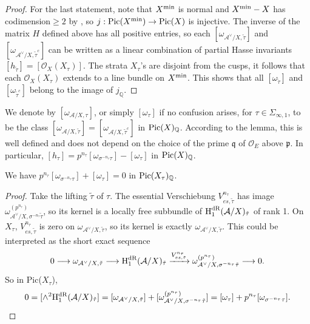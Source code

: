 \documentclass{article}
\begin{document}
\begin{proof}
For the last statement, note that $X^{\textnormal{min}}$ is normal and $X^{\textnormal{min}}-X$ has codimension$\ge2$ by \citep{Lan}, so $j:\textnormal{Pic}(X^{\textnormal{min}})\to \textnormal{Pic}(X)$ is injective. The inverse of the matrix $H$ defined above has all positive entries, so each $[\omega_{\mathcal{A}^\vee/X,\tilde\tau}]$ and $[\omega_{\mathcal{A}^\vee/X,\tilde\tau^c}]$  can be written as a linear combination of partial Hasse invariants $[h_{\tilde\tau}]=[\mathcal{O}_X(X_\tau)]$. The strata $X_\tau$'s are disjoint from the cusps, it follows that each $\mathcal{O}_X(X_\tau)$ extends to a line bundle on $X^{\textnormal{min}}$. This shows that all $[\omega_{\tilde\tau}]$ and $[\omega_{\tilde\tau^c}]$ belong to the image of $j_{\mathbb{Q}}$.
\end{proof}

\begin{notation}
We denote by $[\omega_{\mathcal{A}/X,\tau}]$, or simply $[\omega_\tau]$ if no confusion arises, for $\tau\in \Sigma_{\infty,1}$, to be the class $[\omega_{\mathcal{A}/X,\tilde\tau}]=[\omega_{\mathcal{A}/X,\tilde\tau^c}]$ in $\textnormal{Pic}(X)_{\mathbb{Q}}$. According to the lemma, this is well defined and does not depend on the choice of the prime $\mathfrak{q}$ of $\mathcal{O}_E$ above $\mathfrak{p}$. In particular, $[h_\tau]=p^{n_\tau}[\omega_{\sigma^{-n_\tau}\tau}]-[\omega_{\tau}]$ in $\textnormal{Pic}(X)_{\mathbb{Q}}$.
\end{notation}

\begin{lemma}\label{calculation}
We have $p^{n_\tau}[\omega_{\sigma^{-n_\tau}\tau}]+[\omega_{\tau}]=0$ in $\textnormal{Pic}(X_\tau)_{\mathbb{Q}}$.
\begin{proof} Take the lifting $\tilde\tau$ of $\tau$. 
The essential Verschiebung $V_{es,\tilde\tau}^{n_\tau}$ has image $\omega^{(p^{n_\tau})}_{\mathcal{A}^\vee/X,\sigma^{-n_\tau}\tilde\tau}$, so its kernel is a locally free subbundle of $\textnormal{H}^{\textnormal{dR}}_1(\mathcal{A}/X)_{\tilde\tau}$ of rank 1. On $X_\tau$, $V^{n_\tau}_{es,\tilde\tau}$ is zero on $\omega_{\mathcal{A}^\vee/X,\tilde\tau}$, so its kernel is exactly $\omega_{\mathcal{A}^\vee/X,\tilde\tau}$. This could be interpreted as the short exact sequence
\begin{equation}
0\longrightarrow \omega_{\mathcal{A}^\vee/X,\tilde\tau}\longrightarrow \textnormal{H}^{\textnormal{dR}}_1(\mathcal{A}/X)_{\tilde\tau}\xrightarrow{V_{es,\tilde\tau}^{n_\tau}}  \omega^{(p^{n_\tau})}_{\mathcal{A}^\vee/X,\sigma^{-n_\tau}\tilde\tau}\longrightarrow 0.
\end{equation}
So in Pic($X_\tau$), 
\begin{equation}
0=[\wedge^2 \mathrm{H}^{\rm dR}_1(\mathcal{A}/X)_{\tilde\tau}]=[\omega_{\mathcal{A}^\vee/X,\tilde\tau}]+[\omega^{(p^{n_\tau})}_{\mathcal{A}^\vee/X,\sigma^{-n_\tau}\tilde\tau}]=[\omega_\tau]+p^{n_\tau}[\omega_{\sigma^{-n_\tau}\tau}].
\end{equation}
\end{proof}
\end{lemma}
\end{document}
